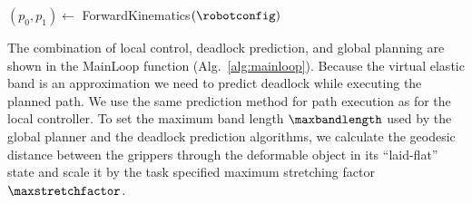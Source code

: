 

\begin{algorithm}[t]
\caption{GoalCheck$(\rrtnodeset, \eepositiongoal, \goalreachradius, \bandgoal)$}
\begin{algorithmic}[1]
        \State $(p_0, p_1) \gets$ ForwardKinematics$(\robotconfig)$
            \State {}
        \EndIf
    \EndFor
    \State {}
\end{algorithmic}
\label{alg:goal_check}
\end{algorithm}




The combination of local control, deadlock prediction, and global planning are shown in the MainLoop function (Alg.~\ref{alg:mainloop}). Because the virtual elastic band is an approximation we need to predict deadlock while executing the planned path. We use the same prediction method for path execution as for the local controller. To set the maximum band length $\maxbandlength$ used by the global planner and the deadlock prediction algorithms, we calculate the geodesic distance between the grippers through the deformable object in its ``laid-flat'' state and scale it by the task specified maximum stretching factor $\maxstretchfactor$.




